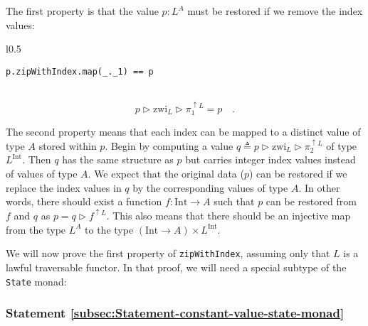 The first property is that the value $p:L^{A}$ must be restored if
we remove the index values:

\begin{wrapfigure}{l}{0.5\columnwidth}%
\vspace{-1\baselineskip}
\begin{lstlisting}
p.zipWithIndex.map(_._1) == p
\end{lstlisting}
\vspace{-0.5\baselineskip}
\end{wrapfigure}%

~\vspace{-0.5\baselineskip}
\[
p\triangleright\text{zwi}_{L}\triangleright\pi_{1}^{\uparrow L}=p\quad.
\]

The second property means that each index can be mapped to a distinct
value of type $A$ stored within $p$. Begin by computing a value
$q\triangleq p\triangleright\text{zwi}_{L}\triangleright\pi_{2}^{\uparrow L}$
of type $L^{\text{Int}}$. Then $q$ has the same structure as $p$
but carries integer index values instead of values of type $A$. We
expect that the original data ($p$) can be restored if we replace
the index values in $q$ by the corresponding values of type $A$.
In other words, there should exist a function $f:\text{Int}\rightarrow A$
such that $p$ can be restored from $f$ and $q$ as $p=q\triangleright f^{\uparrow L}$.
This also means that there should be an injective map from the type
$L^{A}$ to the type $(\text{Int}\rightarrow A)\times L^{\text{Int}}$.

We will now prove the first property of \lstinline!zipWithIndex!,
assuming only that $L$ is a lawful traversable functor. In that proof,
we will need a special subtype of the \lstinline!State! monad:

\subsubsection{Statement \label{subsec:Statement-constant-value-state-monad}\ref{subsec:Statement-constant-value-state-monad}}

